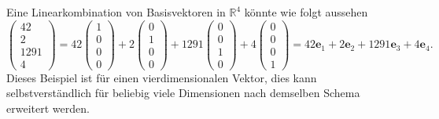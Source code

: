 \begin{beispiel}
Eine Linearkombination von Basisvektoren in $\mathbb{R}^4$ könnte wie folgt aussehen
    \begin{equation*}
        \begin{pmatrix} 
        42 \\ 2 \\ 1291 \\ 4    
        \end{pmatrix} 
        = 
        42 \begin{pmatrix}
        1 \\ 0 \\ 0 \\ 0 
        \end{pmatrix} 
        +
        2 \begin{pmatrix} 
        0 \\ 1 \\ 0 \\ 0 
        \end{pmatrix}
        +
        1291 
        \begin{pmatrix} 
        0 \\ 0 \\ 1 \\ 0 
        \end{pmatrix} 
        +
        4 \begin{pmatrix} 
        0 \\ 0 \\ 0 \\ 1 
        \end{pmatrix} 
        = 
        42\textbf{e}_1
        + 
        2\textbf{e}_2
        + 
        1291\textbf{e}_3
        + 
        4\textbf{e}_4.
    \end{equation*}
Dieses Beispiel ist für einen vierdimensionalen Vektor, dies kann selbstverständlich für beliebig viele Dimensionen nach demselben Schema erweitert werden.
\end{beispiel}
